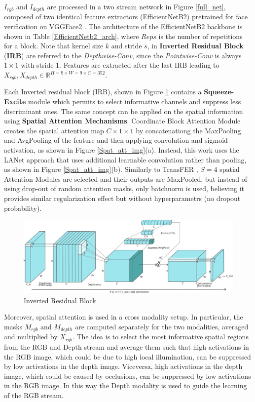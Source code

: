 $I_{rgb}$ and $I_{depth}$ are processed in a two stream network in Figure \ref{full_net}, composed of two identical feature extractors (EfficientNetB2) pretrained for face verification on VGGFace2 \cite{RW_7_EFF2}. The architecture of the EfficientNetB2 backbone is shown in Table \ref{EfficientNetb2_arch}, where $Reps$ is the number of repetitions for a block. Note that kernel size $k$ and stride $s$, in \textbf{Inverted Residual Block} (\textbf{IRB}) are referred to the \textit{Depthwise-Conv}, since the \textit{Pointwise-Conv} is always $1\times1$ with stride 1. Features are extracted after the last IRB leading to $X_{rgb}, X_{depth} \in \mathbb{R}^{H=9 \times W=9 \times C=352}$.

Each Inverted residual block (IRB), shown in Figure \ref{inv_res_block} contains a \textbf{Squeeze-Excite} module which permits to select informative channels and suppress less discriminant ones. The same concept can be applied on the spatial information using \textbf{Spatial Attention Mechanisms}. Coordinate Block Attention Module \cite{CBAM} creates the spatial attention map $C \times 1 \times 1$ by concatenationg the MaxPooling and AvgPooling of the feature and then applying convolution and sigmoid activation, as shown in Figure \ref{Spat_att_img}(a). Instead, this work uses the LANet \cite{LANET} approach that uses additional learnable convolution rather than pooling, as shown in Figure \ref{Spat_att_img}(b). Similarly to TransFER \cite{RW_4_TRANSFER}, $S=4$ spatial Attention Modules are selected and their outputs are MaxPooled, but instead of using drop-out of random attention masks, only batchnorm is used, believing it provides similar regularization effect but without hyperparametrs (no dropout probability).

\begin{figure}[ht]
    \centering
    \includegraphics[width=2\columnwidth]{Images/inv_res_block.png}
    \caption{Inverted Residual Block}
    \label{inv_res_block}
\end{figure}


Moreover, spatial attention is used in a cross modality setup. In particular, the masks $M_{rgb}$ and $M_{depth}$ are computed separately for the two modalities, averaged and multiplied by $X_{rgb}$. The idea is to select the most informative spatial regions from the RGB and Depth stream and average them such that high activations in the RGB image, which could be due to high local illumination, can be suppressed by low activations in the depth image. Viceversa, high activations in the depth image, which could be caused by occlusions, can be suppressed by low activations in the RGB image. In this way the Depth modality is used to guide the learning of the RGB stream.
 
